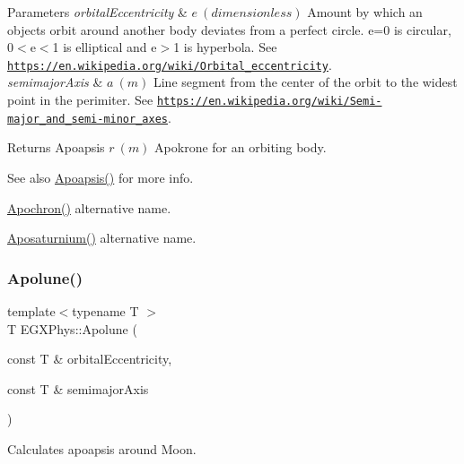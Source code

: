 \begin{DoxyParams}{Parameters}
{\em orbital\+Eccentricity} & $ e\ (dimensionless)$ Amount by which an objects orbit around another body deviates from a perfect circle. e=0 is circular, 0$<$e$<$1 is elliptical and e$>$1 is hyperbola. See \href{https://en.wikipedia.org/wiki/Orbital_eccentricity}{\tt https\+://en.\+wikipedia.\+org/wiki/\+Orbital\+\_\+eccentricity}. \\
\hline
{\em semimajor\+Axis} & $ a\ (m)$ Line segment from the center of the orbit to the widest point in the perimiter. See \href{https://en.wikipedia.org/wiki/Semi-major_and_semi-minor_axes}{\tt https\+://en.\+wikipedia.\+org/wiki/\+Semi-\/major\+\_\+and\+\_\+semi-\/minor\+\_\+axes}. \\
\hline
\end{DoxyParams}
\begin{DoxyReturn}{Returns}
Apoapsis $ r\ (m)$ Apokrone for an orbiting body. 
\end{DoxyReturn}
\begin{DoxySeeAlso}{See also}
\mbox{\hyperlink{group___e_g_x_phys-_apoapsis_gaf962e650bf84a568458e8eb39b1c61ba}{Apoapsis()}} for more info. 

\mbox{\hyperlink{group___e_g_x_phys-_apoapsis_gae4ea146039e6f32022321f0998e715e8}{Apochron()}} alternative name. 

\mbox{\hyperlink{group___e_g_x_phys-_apoapsis_gac157adc20a88c8616e4822eb819f9016}{Aposaturnium()}} alternative name. 
\end{DoxySeeAlso}
\mbox{\label{group___e_g_x_phys-_apoapsis_gacc68b49812c38394611e1ef3a8bf0e3e}} 
\subsubsection{\texorpdfstring{Apolune()}{Apolune()}}
{\footnotesize\ttfamily template$<$typename T $>$ \\
T E\+G\+X\+Phys\+::\+Apolune (\begin{DoxyParamCaption}\item[{const T \&}]{orbital\+Eccentricity,  }\item[{const T \&}]{semimajor\+Axis }\end{DoxyParamCaption})}



Calculates apoapsis around Moon. 


